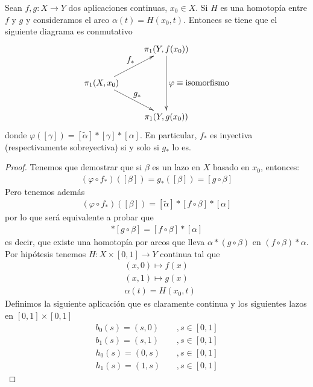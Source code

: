 \begin{lema}
    Sean $f,g:X\to Y$ dos aplicaciones continuas, $x_0\in X$. Si $H$ es una homotopía entre $f$ y $g$ y consideramos el arco $\alpha(t)=H(x_0, t)$. Entonces se tiene que el siguiente diagrama es conmutativo
    \begin{gather*}    
        \xymatrix{ %
        & \pi_1(Y,f(x_0)) \ar[dd]^{\displaystyle\varphi \equiv \text{isomorfismo}}\\
        \pi_1(X,x_0) \ar[ur]^{\displaystyle f_*} \ar[dr]^{\displaystyle g_*}\\ 
        & \pi_1(Y, g(x_0))
        }
    \end{gather*}
    donde $\varphi([\gamma]) = [\tilde{\alpha}] \ast [\gamma] \ast [\alpha]$. En particular, $f_*$ es inyectiva (respectivamente sobreyectiva) si y solo si $g_*$ lo es.

    \begin{proof}
        Tenemos que demostrar que si $\beta$ es un lazo en $X$ basado en $x_0$, entonces:
        \begin{gather*}
            (\varphi \circ f_*) ([\beta]) = g_*([\beta]) = [g\circ \beta]
        \end{gather*}
        Pero tenemos además
        \begin{gather*}
            (\varphi \circ f_*) ([\beta]) = [\tilde{\alpha}] \ast [f\circ \beta] \ast [\alpha]
        \end{gather*}
        por lo que será equivalente a probar que
        \begin{gather*}
            [\alpha]\ast [g\circ \beta] = [f\circ \beta] \ast [\alpha]
        \end{gather*}
        es decir, que existe una homotopía por arcos que lleva $\alpha \ast(g\circ \beta)$ en $(f\circ \beta) \ast \alpha$.\\

        Por hipótesis tenemos $H:X\times[0,1]\to Y$ continua tal que 
        \begin{align*}
            &(x,0) \mapsto f(x)\\
            &(x,1) \mapsto g(x)\\
            &\alpha(t) = H(x_0,t)
        \end{align*}
        Definimos la siguiente aplicación
        que es claramente continua y los siguientes lazos en $[0,1]\times [0,1]$
        \begin{align*}
            b_0(s) = (s,0)\ \ \ \ \ & ,s\in [0,1]\\
            b_1(s) = (s,1)\ \ \ \ \  & ,s\in [0,1]\\
            h_0(s) = (0,s)\ \ \ \ \  & ,s\in [0,1]\\
            h_1(s) = (1,s)\ \ \ \ \ & ,s\in [0,1]
        \end{align*}


\end{proof}
\end{lema}
